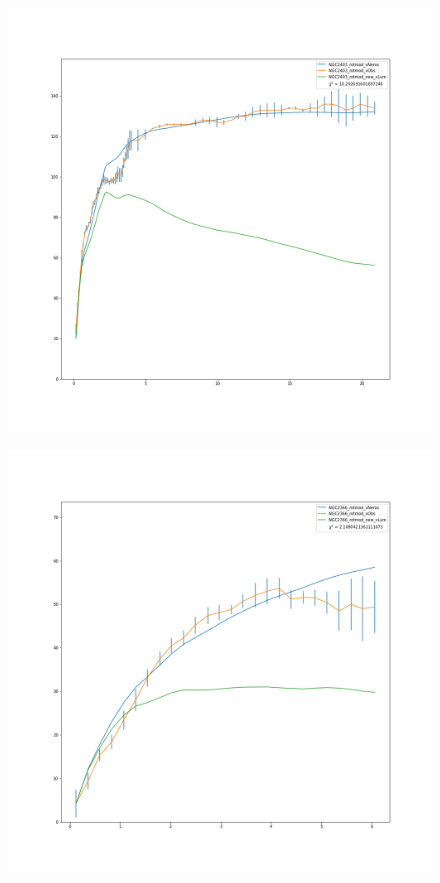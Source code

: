 \documentclass[reprint,%
 amsmath,amssymb,
 aps,
]{revtex4-1}
\begin{document}
            \begin{figure}
\centering
\begin{minipage}{.5\textwidth}
  \centering
  \includegraphics[width=.95\linewidth]{figures/NGC2403_rotmod_XueSofue.png}
  \label{fig:test1}
\end{minipage}%
\begin{minipage}{.5\textwidth}
  \centering
  \includegraphics[width=.95\linewidth]{figures/NGC2366_rotmod_XueSofue.png}

\end{minipage}
\end{figure}
\end{document}
